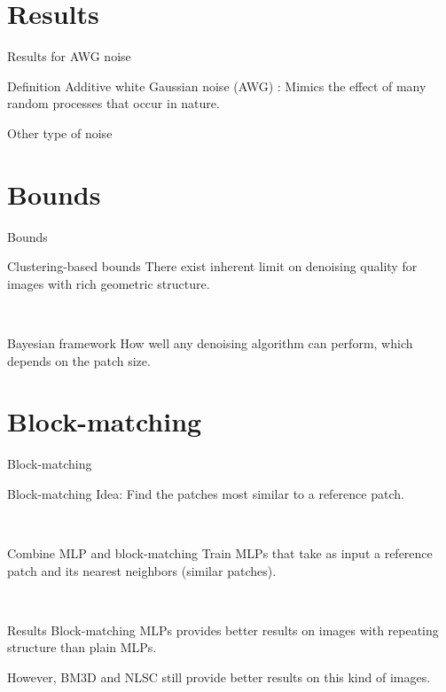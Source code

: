 \documentclass[8pt]{beamer}
\begin{document}
\section{Results}

\begin{frame}{Results for AWG noise}
\begin{block}{Definition}
Additive white Gaussian noise (AWG) : Mimics the effect of many random processes that occur in nature. %
\end{block} 
\end{frame}


\begin{frame}{Other type of noise}
\end{frame}

\section{Bounds}

\begin{frame}{Bounds}


\begin{block}{Clustering-based bounds}
There exist inherent limit on denoising quality for images with rich geometric structure.
\end{block}\

\begin{block}{Bayesian framework}
How well any denoising algorithm can perform, which depends on the patch size.
\end{block}

\end{frame}

\section{Block-matching}
\begin{frame}{Block-matching}
\begin{block}{Block-matching}
Idea: Find the patches most similar to a reference patch.
\end{block}\

\begin{block}{Combine MLP and block-matching}
Train MLPs that take as input a reference patch and its nearest neighbors (similar patches).
\end{block}\

\begin{block}{Results}
Block-matching MLPs provides better results on images with repeating structure than plain MLPs.

\vspace{0.5em}
However, BM3D and NLSC still provide better results on this kind of images.
\end{block}
\end{frame}
\end{document}
